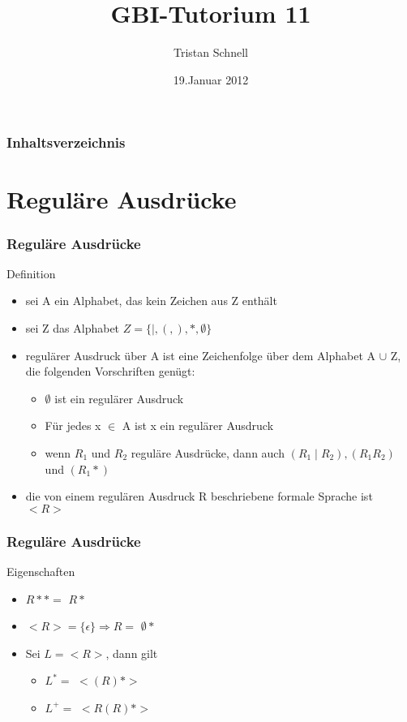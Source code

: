 \documentclass{beamer}
\author{Tristan Schnell}
\title{GBI-Tutorium 11}
\date{19.Januar 2012}
\begin{document}
\begin {frame}
	\titlepage
\end {frame}

\begin {frame}
	\frametitle {Inhaltsverzeichnis}
	\tableofcontents
\end {frame}

\section{Reguläre Ausdrücke}

\begin{frame}
	\frametitle{Reguläre Ausdrücke}
	\begin{block}{Definition}
		\begin{itemize}
			\item sei A ein Alphabet, das kein Zeichen aus Z enthält
			\item sei Z das Alphabet $Z = \{ \mid , (,), \ast , \emptyset \}$
			\item regulärer Ausdruck über A ist eine Zeichenfolge über dem Alphabet A 	$\cup $ Z, die folgenden Vorschriften genügt:
			\pause
				\begin{itemize}
					\item $\emptyset$ ist ein regulärer Ausdruck
					\pause
					\item Für jedes x $\in$ A ist x ein regulärer Ausdruck
					\pause
					\item wenn $R_1$ und $R_2$ reguläre Ausdrücke, dann auch $(R_1 \mid R_2),(R_1 R_2)$ und $(R_1 \ast )$
				\end{itemize}
				\pause
			\item die von einem regulären Ausdruck R beschriebene formale Sprache ist $<R>$
		\end{itemize}
	\end{block}
\end{frame}

\begin{frame}
	\frametitle{Reguläre Ausdrücke}
	\begin{block}{Eigenschaften}
		\begin{itemize}
			\item $R \ast \ast = $ \pause $R\ast$
			\item $<R> = \{ \epsilon \} \Rightarrow R =$ \pause $ \emptyset \ast $
			\item Sei $L = <R>$, dann gilt
				\begin{itemize}
					\item $L^{\ast} = $ \pause $<(R) \ast >$
					\item $L^+ = $ \pause $<R(R) \ast > $
				\end{itemize}
		\end{itemize}
	\end{block}
\end{frame}
\end{document}
